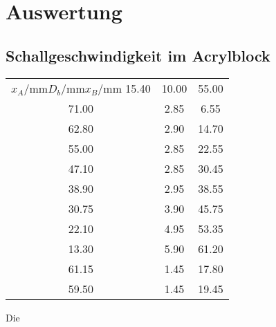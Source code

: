 \section{Auswertung}
\subsection{Schallgeschwindigkeit im Acrylblock}

\begin{table}
    \begin{tabular}{S S S}
        {$x_A/\unit{\mm} $}{$D_b/\unit{\mm}$}{$x_B/\unit{\mm}$}
        15.40   &  10.00    & 55.00         \\
        71.00   &  2.85     & 6.55          \\
        62.80   &  2.90     & 14.70         \\
        55.00   &  2.85     & 22.55         \\
        47.10   &  2.85     & 30.45         \\
        38.90   &  2.95     & 38.55         \\
        30.75   &  3.90     & 45.75         \\
        22.10   &  4.95     & 53.35         \\
        13.30   &  5.90     & 61.20         \\
        61.15   &  1.45     & 17.80         \\
        59.50   &  1.45     & 19.45         \\
    \end{tabular}
\end{table}
Die 